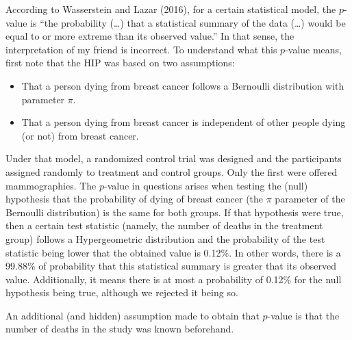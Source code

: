 \documentclass[11pt, english]{article}
\begin{document}
    According to Wasserstein and Lazar (2016), for a certain statistical
model, the \(p\)-value is ``the probability (\ldots) that a statistical
summary of the data (\ldots) would be equal to or more extreme than its
observed value.'' In that sense, the interpretation of my friend is
incorrect. To understand what this \(p\)-value means, first note that the HIP was
based on two assumptions:
	\begin{itemize}
		\item That a person dying from breast cancer follows a Bernoulli distribution
with parameter \(\pi\).

		\item That a person dying from breast cancer is independent of other people
dying (or not) from breast cancer.
	\end{itemize}
	
Under that model, a randomized control trial was designed and the
participants assigned randomly to treatment and control groups. Only the
first were offered mammographies. The \(p\)-value in questions arises
when testing the (null) hypothesis that the probability of dying of
breast cancer (the \(\pi\) parameter of the Bernoulli distribution) is
the same for both groups. If that hypothesis were true, then a certain
test statistic (namely, the number of deaths in the treatment group)
follows a Hypergeometric distribution and the probability of the test
statistic being lower that the obtained value is 0.12\%. In other words,
there is a 99.88\% of probability that this statistical summary is
greater that its observed value. Additionally, it means there is at most
a probability of 0.12\% for the null hypothesis being true, although we
rejected it being so.

An additional (and hidden) assumption made to obtain that \(p\)-value is
that the number of deaths in the study was known beforehand.
\end{document}
